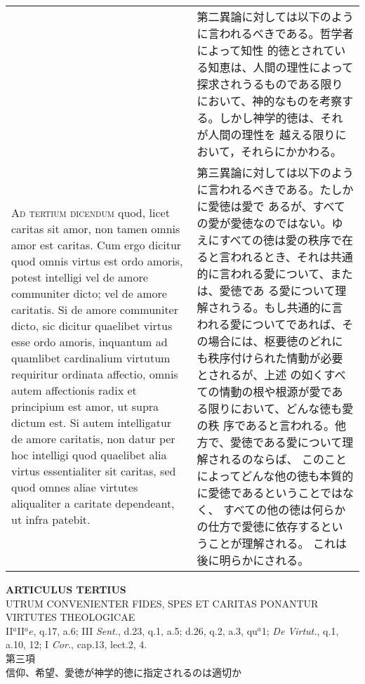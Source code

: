 \documentclass[10pt]{jsarticle}
\begin{document}
\begin{longtable}{p{21em}p{21em}}
&

 第二異論に対しては以下のように言われるべきである。哲学者によって知性
 的徳とされている知恵は、人間の理性によって探求されうるものである限り
 において、神的なものを考察する。しかし神学的徳は、それが人間の理性を
 越える限りにおいて，それらにかかわる。

 
\\



{\scshape Ad tertium dicendum} quod, licet caritas sit amor, non tamen
omnis amor est caritas. Cum ergo dicitur quod omnis virtus est ordo
amoris, potest intelligi vel de amore communiter dicto; vel de amore
caritatis. Si de amore communiter dicto, sic dicitur quaelibet virtus
esse ordo amoris, inquantum ad quamlibet cardinalium virtutum
requiritur ordinata affectio, omnis autem affectionis radix et
principium est amor, ut supra dictum est. Si autem intelligatur de
amore caritatis, non datur per hoc intelligi quod quaelibet alia
virtus essentialiter sit caritas, sed quod omnes aliae virtutes
aliqualiter a caritate dependeant, ut infra patebit.

&

 第三異論に対しては以下のように言われるべきである。たしかに愛徳は愛で
 あるが、すべての愛が愛徳なのではない。ゆえにすべての徳は愛の秩序で在
 ると言われるとき、それは共通的に言われる愛について、または、愛徳であ
 る愛について理解されうる。もし共通的に言われる愛についてであれば、そ
 の場合には、枢要徳のどれにも秩序付けられた情動が必要とされるが、上述
 の如くすべての情動の根や根源が愛である限りにおいて、どんな徳も愛の秩
 序であると言われる。他方で、愛徳である愛について理解されるのならば、
 このことによってどんな他の徳も本質的に愛徳であるということではなく、
 すべての他の徳は何らかの仕方で愛徳に依存するということが理解される。
 これは後に明らかにされる。

\end{longtable}
\newpage




\begin{center}
{\Large {\bf ARTICULUS TERTIUS}}\\
{\large UTRUM CONVENIENTER FIDES, SPES ET CARITAS PONANTUR VIRTUTES THEOLOGICAE}\\
{\footnotesize II${^a}$II${^ae}$, q.17, a.6; III {\itshape Sent.}, d.23, q.1, a.5; d.26, q.2, a.3, qu$^{a}$1; {\itshape De Virtut.}, q.1, a.10, 12; I {\itshape Cor.}, cap.13, lect.2, 4.}\\
{\Large 第三項\\信仰、希望、愛徳が神学的徳に指定されるのは適切か}
\end{center}
\end{document}

